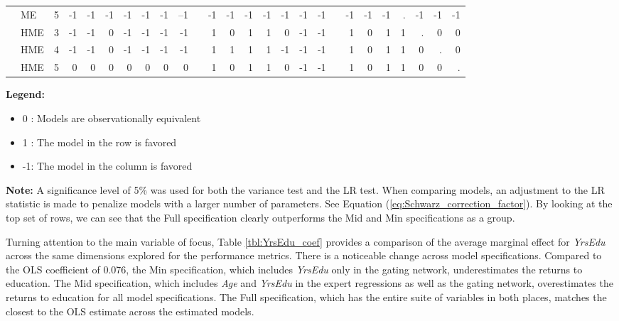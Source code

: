 \documentclass[12pt]{article}
\theoremstyle{definition}
\begin{document}
\begin{landscape}
\begin{table}[t!]
\begin{threeparttable}
{\begin{tabular}[r]{l l l r r r r r r r r r r r r r r r r r r r r r r r}
         & ME  & 5       & -1  & -1  & -1  & -1  & -1   & -1   & --1          && -1  &  -1 & -1  & -1  & -1   & -1   &  -1          && -1  & -1  & -1  &  .  & -1   & -1   & -1       \\
         & HME & 3       & -1  & -1  &  0  & -1  & -1   & -1   &  -1          &&  1  &   0 &  1  &  1  &  0   & -1   &  -1          &&  1  &  0  &  1  &  1  &  .   &  0   &  0       \\
         & HME & 4       & -1  & -1  &  0  & -1  & -1   & -1   &  -1          &&  1  &   1 &  1  &  1  & -1   & -1   &  -1          &&  1  &  0  &  1  &  1  &  0   &  .   &  0       \\
         & HME & 5       &  0  &  0  &  0  &  0  &  0   &  0   &   0          &&  1  &   0 &  1  &  1  &  0   & -1   &  -1          &&  1  &  0  &  1  &  1  &  0   &  0   &  .       \\
        \cmidrule(l){1-26}
    \end{tabular}
    }
    \begin{tablenotes}
      \item{\footnotesize \textbf{Legend:}
      \begin{itemize}
        \item 0 :  Models are observationally equivalent
        \item 1 :  The model in the row is favored
        \item -1: The model in the column is favored
      \end{itemize}
      }
      \item{\footnotesize \textbf{Note:}
      A significance level of 5\% was used for both the variance test and
      the LR test. When comparing models, an adjustment to the LR statistic
      is made to penalize models with a larger number of parameters. See
      Equation (\ref{eq:Schwarz_correction_factor}). By looking at the
      top set of rows, we can see that the Full specification
      clearly outperforms the Mid and Min specifications as a group.}
    \end{tablenotes} \label{tbl:voung_comparison}
  \end{threeparttable}
\end{table}
\end{landscape}


Turning attention to the main variable of focus, Table \ref{tbl:YrsEdu_coef} provides a 
comparison of the average marginal effect for \textit{YrsEdu} across the same dimensions
explored for the performance metrics. There is a noticeable change across model specifications.
Compared to the OLS coefficient of 0.076, the Min specification,
which includes \textit{YrsEdu} only in the gating network, underestimates the returns
to education. The Mid specification, which includes \textit{Age} and
\textit{YrsEdu} in the expert regressions as well as the gating network,
overestimates the returns to education for all model specifications. The Full specification,
which has the entire suite of variables in both places, matches the closest
to the OLS estimate across the estimated models.
\end{document}

